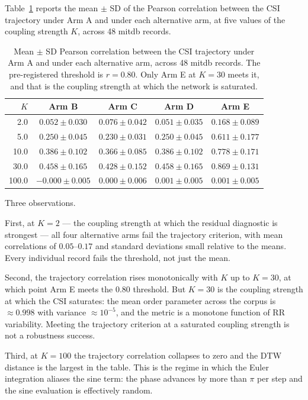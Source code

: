 \documentclass[11pt]{article}
\begin{document}
Table~\ref{tab:trajectory} reports the mean $\pm$ SD of the Pearson
correlation between the CSI trajectory under Arm A and under each
alternative arm, at five values of the coupling strength $K$, across
48 mitdb records.

\begin{table}[h]
\centering
\begin{tabular}{r|cccc}
\toprule
$K$ & Arm B & Arm C & Arm D & Arm E \\
\midrule
2.0 & $0.052 \pm 0.030$ & $0.076 \pm 0.042$ & $0.051 \pm 0.035$ & $0.168 \pm 0.089$ \\
5.0 & $0.250 \pm 0.045$ & $0.230 \pm 0.031$ & $0.250 \pm 0.045$ & $0.611 \pm 0.177$ \\
10.0 & $0.386 \pm 0.102$ & $0.366 \pm 0.085$ & $0.386 \pm 0.102$ & $0.778 \pm 0.171$ \\
30.0 & $0.458 \pm 0.165$ & $0.428 \pm 0.152$ & $0.458 \pm 0.165$ & $\mathbf{0.869 \pm 0.131}$ \\
100.0 & $-0.000 \pm 0.005$ & $0.000 \pm 0.006$ & $0.001 \pm 0.005$ & $0.001 \pm 0.005$ \\
\bottomrule
\end{tabular}
\caption{Mean $\pm$ SD Pearson correlation between the CSI trajectory
under Arm A and under each alternative arm, across 48 mitdb records.
The pre-registered threshold is $r = 0.80$. Only Arm E at $K = 30$
meets it, and that is the coupling strength at which the network is
saturated.}
\label{tab:trajectory}
\end{table}

Three observations.

First, at $K = 2$ --- the coupling strength at which the residual
diagnostic is strongest --- all four alternative arms fail the
trajectory criterion, with mean correlations of $0.05$--$0.17$ and
standard deviations small relative to the means. Every individual
record fails the threshold, not just the mean.

Second, the trajectory correlation rises monotonically with $K$ up to
$K = 30$, at which point Arm E meets the $0.80$ threshold. But $K =
30$ is the coupling strength at which the CSI saturates: the mean
order parameter across the corpus is $\approx 0.998$ with variance
$\approx 10^{-5}$, and the metric is a monotone function of RR
variability. Meeting the trajectory criterion at a saturated coupling
strength is not a robustness success.

Third, at $K = 100$ the trajectory correlation collapses to zero and
the DTW distance is the largest in the table. This is the regime in
which the Euler integration aliases the sine term: the phase advances
by more than $\pi$ per step and the sine evaluation is effectively
random.
\end{document}
